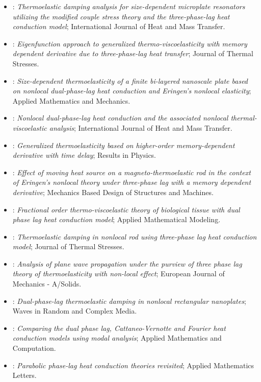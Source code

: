 \begin{itemize}
\item \citet{Kumar2020}: \emph{Thermoelastic damping analysis for size-dependent microplate resonators utilizing the modified couple stress theory and the three-phase-lag heat conduction model}; International Journal of Heat and Mass Transfer.
\item \citet{Singh2020a}: \emph{Eigenfunction approach to generalized thermo-viscoelasticity with memory dependent derivative due to three-phase-lag heat transfer}; Journal of Thermal Stresses.
\item \citet{Xue2020}: \emph{Size-dependent thermoelasticity of a finite bi-layered nanoscale plate based on nonlocal dual-phase-lag heat conduction and Eringen's nonlocal elasticity}; Applied Mathematics and Mechanics.
\item \citet{Yang2020}: \emph{Nonlocal dual-phase-lag heat conduction and the associated nonlocal thermal-viscoelastic analysis}; International Journal of Heat and Mass Transfer.
\item \citet{Abouelregal2021}: \emph{Generalized thermoelasticity based on higher-order memory-dependent derivative with time delay}; Results in Physics.
\item \citet{Bayones2021}: \emph{Effect of moving heat source on a magneto-thermoelastic rod in the context of Eringen’s nonlocal theory under three-phase lag with a memory dependent derivative}; Mechanics Based Design of Structures and Machines.
\item \citet{Li2021}: \emph{Fractional order thermo-viscoelastic theory of biological tissue with dual phase lag heat conduction model}; Applied Mathematical Modeling.
\item \citet{Satish2021}: \emph{Thermoelastic damping in nonlocal rod using three-phase lag heat conduction model}; Journal of Thermal Stresses.
\item \citet{Tiwari2021}: \emph{Analysis of plane wave propagation under the purview of three phase lag theory of thermoelasticity with non-local effect}; European Journal of Mechanics - A/Solids.
\item \citet{Yang2021}: \emph{Dual-phase-lag thermoelastic damping in nonlocal rectangular nanoplates}; Waves in Random and Complex Media.
\item \citet{vanDerMerwe2021}: \emph{Comparing the dual phase lag, Cattaneo-Vernotte and Fourier heat conduction models using modal analysis}; Applied Mathematics and Computation.
\item \citet{Miranville2022}: \emph{Parabolic phase-lag heat conduction theories revisited}; Applied Mathematics Letters.

\end{itemize}

